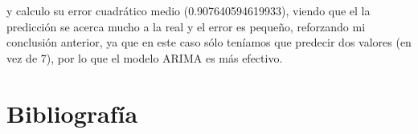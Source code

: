 y calculo su error cuadrático medio (0.907640594619933), viendo que el la predicción se acerca mucho a la real y el error es pequeño, reforzando mi conclusión anterior, ya que en este caso sólo teníamos que predecir dos valores (en vez de 7), por lo que el modelo ARIMA es más efectivo.
\newpage
\section{Bibliografía}




